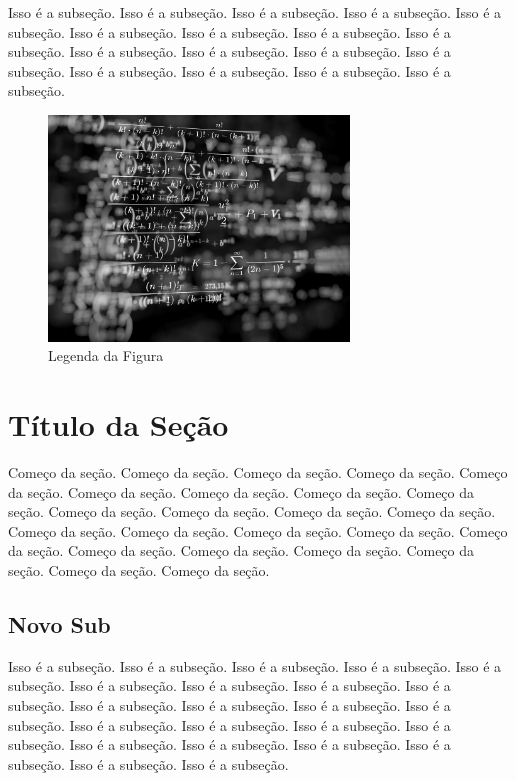 \documentclass[oneside,a4paper,12pt]{article}
\begin{document}
Isso é a subseção. Isso é a subseção. Isso é a subseção. Isso é a subseção. Isso é a subseção. Isso é a subseção. Isso é a subseção. Isso é a subseção. Isso é a subseção. Isso é a subseção. Isso é a subseção. Isso é a subseção. Isso é a subseção. Isso é a subseção. Isso é a subseção. Isso é a subseção. Isso é a subseção. 


	\begin{figure}[h]
	\center
	\includegraphics[width=8cm]{Figuras/imagem.jpg}
	\caption{Legenda da Figura}
	\label{rotulodafigura}
	\end{figure}


\section{Título da Seção}

Começo da seção. Começo da seção. Começo da seção. Começo da seção. Começo da seção. Começo da seção. Começo da seção. Começo da seção. Começo da seção. Começo da seção. Começo da seção. Começo da seção. Começo da seção. Começo da seção. Começo da seção. Começo da seção. Começo da seção. Começo da seção. Começo da seção. Começo da seção. Começo da seção. Começo da seção. Começo da seção. Começo da seção.

\subsection{Novo Sub}

Isso é a subseção. Isso é a subseção. Isso é a subseção. Isso é a subseção. Isso é a subseção. Isso é a subseção. Isso é a subseção. Isso é a subseção. Isso é a subseção. Isso é a subseção. Isso é a subseção. Isso é a subseção. Isso é a subseção. Isso é a subseção. Isso é a subseção. Isso é a subseção. Isso é a subseção. Isso é a subseção. Isso é a subseção. Isso é a subseção. Isso é a subseção. Isso é a subseção. Isso é a subseção. 
\end{document}
